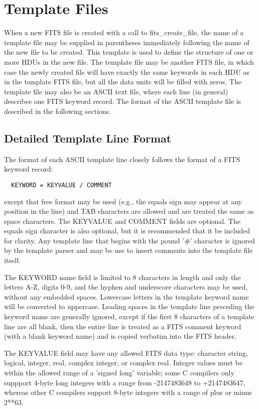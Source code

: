 \documentclass[11pt]{book}
\begin{document}
\chapter{Template Files }

When a new FITS file is created with a call to fits\_create\_file, the
name of a template file may be supplied in parentheses immediately
following the name of the new file to be created.  This template is
used to define the structure of one or more HDUs in the new file.  The
template file may be another FITS file, in which case the newly created
file will have exactly the same keywords in each HDU as in the template
FITS file, but all the data units will be filled with zeros.  The
template file may also be an ASCII text file, where each line (in
general) describes one FITS keyword record.  The format of the ASCII
template file is described in the following sections.


\section{Detailed Template Line Format}

The format of each ASCII template line closely follows the format of a
FITS keyword record:

\begin{verbatim}
  KEYWORD = KEYVALUE / COMMENT
\end{verbatim}
except that free format may be used (e.g., the equals sign may appear
at any position in the line) and TAB characters are allowed and are
treated the same as space characters.  The KEYVALUE and COMMENT fields
are optional.  The equals sign character is also optional, but it is
recommended that it be included for clarity.  Any template line that
begins with the pound '\#' character is ignored by the template parser
and may be use to insert comments into the template file itself.

The KEYWORD name field is limited to 8 characters in length and only
the letters A-Z, digits 0-9, and the hyphen and underscore characters
may be used, without any embedded spaces. Lowercase letters in the
template keyword name will be converted to uppercase.  Leading spaces
in the template line preceding the keyword name are generally ignored,
except if the first 8 characters of a template line are all blank, then
the entire line is treated as a FITS comment keyword (with a blank
keyword name) and is copied verbatim into the FITS header.

The KEYVALUE field may have any allowed  FITS  data type: character
string, logical, integer, real, complex integer, or complex real.  Integer
values must be within the allowed range of a 'signed long' variable;
some C compilers only suppport 4-byte long integers with a range
from -2147483648 to +2147483647, whereas other C compilers support 8-byte
integers with a range of plus or minus 2**63.
\end{document}
